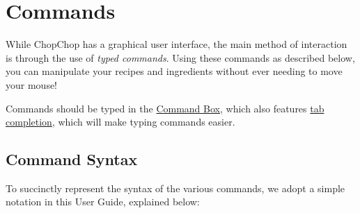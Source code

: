 



\pagebreak
\hypertarget{Commands}{}
\section{Commands}

While ChopChop has a graphical user interface, the main method of interaction is through the use of \emph{typed commands}.
Using these commands as described below, you can manipulate your recipes and ingredients without ever needing to move your mouse!

Commands should be typed in the \hyperlink{CommandBox}{Command Box}, which also features \hyperlink{TabCompletion}{tab completion},
which will make typing commands easier.


\subsection{Command Syntax}

	To succinctly represent the syntax of the various commands, we adopt a simple notation in this User Guide, explained below:

